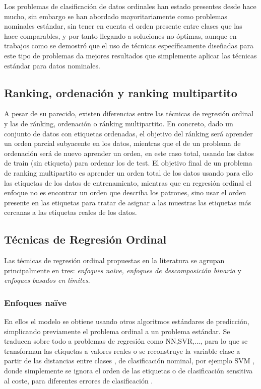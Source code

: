 Los problemas de clasificación de datos ordinales han estado presentes desde hace mucho, sin embargo se han abordado mayoritariamente como problemas nominales estándar, sin tener en cuenta el orden presente entre clases que las hace comparables, y por tanto llegando a soluciones no óptimas, aunque en trabajos como \cite{Gutiérrez2016} se demostró que el uso de técnicas específicamente diseñadas para este tipo de problemas da mejores resultados que simplemente aplicar las técnicas estándar para datos nominales. 

\subsection{Ranking, ordenación y ranking multipartito}
A pesar de su parecido, existen diferencias entre las técnicas de regresión ordinal y las de ránking, ordenación o ránking multipartito. En concreto, dado un conjunto de datos con etiquetas ordenadas, el objetivo del ránking será aprender un orden parcial subyacente en los datos, mientras que el de un problema de ordenación será de nuevo aprender un orden, en este caso total, usando los datos de train (sin etiqueta) para ordenar los de test. El objetivo final de un problema de ranking multipartito es aprender un orden total de los datos usando para ello las etiquetas de los datos de entrenamiento, mientras que en regresión ordinal el enfoque no es encontrar un orden que describa los patrones, sino usar el orden presente en las etiquetas para tratar de asignar a las muestras las etiquetas más cercanas a las etiquetas reales de los datos. 

\subsection{Técnicas de Regresión Ordinal}
Las técnicas de regresión ordinal propuestas en la literatura se agrupan principalmente en tres: \textit{enfoques naïve, enfoques de descomposición binaria} y \textit{enfoques basados en límites}. 
\subsubsection{Enfoques naïve}
En ellos el modelo se obtiene usando otros algoritmos estándares de predicción, simplicando previamente el problema ordinal a un problema estándar. Se traducen sobre todo a problemas de regresión como NN,SVR,..., para lo que se transforman las etiquetas a valores reales \cite{Torra2006} o se reconstruye la variable clase a partir de las distancias entre clases \cite{Sanchez2013}, de clasificación nominal, por ejemplo SVM \cite{Vapnik2015}, donde simplemente se ignora el orden de las etiquetas o de clasificación sensitiva al coste, para diferentes errores de clasificación \cite{unknown}.  
